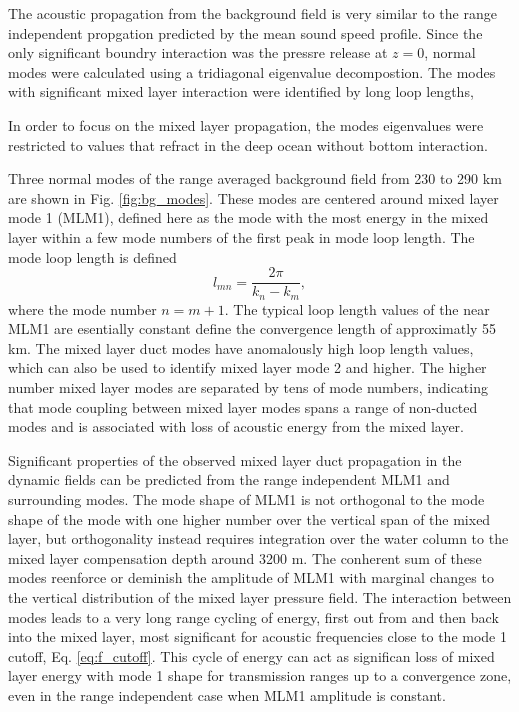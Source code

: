\documentclass[preprint,NumberedRefs]{JASA}
\begin{document}
The acoustic propagation from the background field is very similar to the range independent propgation predicted by the mean sound speed profile. Since the only significant boundry interaction was the pressre release at $z=0$, normal modes were calculated using a tridiagonal eigenvalue decompostion. The modes with significant mixed layer interaction were identified by long loop lengths,

In order to focus on the mixed layer propagation, the modes eigenvalues were restricted to values that refract in the deep ocean without bottom interaction.

Three normal modes of the range averaged background field from 230 to 290 km are shown in Fig. \ref{fig:bg_modes}. These modes are centered around mixed layer mode 1 (MLM1), defined here as the mode with the most energy in the mixed layer within a few mode numbers of the first peak in mode loop length. The mode loop length is defined
\begin{equation}
    l_{mn} = \frac{2 \pi}{k_n - k_m},
    \label{eq:loop_length}
\end{equation}
where the mode number $n=m+1$. The typical loop length values of the near MLM1 are esentially constant define the convergence length of approximatly 55 km. The mixed layer duct modes have anomalously high loop length values, which can also be used to identify mixed layer mode 2 and higher. The higher number mixed layer modes are separated by tens of mode numbers, indicating that mode coupling between mixed layer modes spans a range of non-ducted modes and is associated with loss of acoustic energy from the mixed layer.

Significant properties of the observed mixed layer duct propagation in the dynamic fields can be predicted from the range independent MLM1 and surrounding modes. The mode shape of MLM1 is not orthogonal to the mode shape of the mode with one higher number over the vertical span of the mixed layer, but orthogonality instead requires integration over the water column to the mixed layer compensation depth around 3200 m. The conherent sum of these modes reenforce or deminish the amplitude of MLM1 with marginal changes to the vertical distribution of the mixed layer pressure field. The interaction between modes leads to a very long range cycling of energy, first out from and then back into the mixed layer, most significant for acoustic frequencies close to the mode 1 cutoff, Eq. \eqref{eq:f_cutoff}. This cycle of energy can act as significan loss of mixed layer energy with mode 1 shape for transmission ranges up to a convergence zone, even in the range independent case when MLM1 amplitude is constant.
\end{document}
